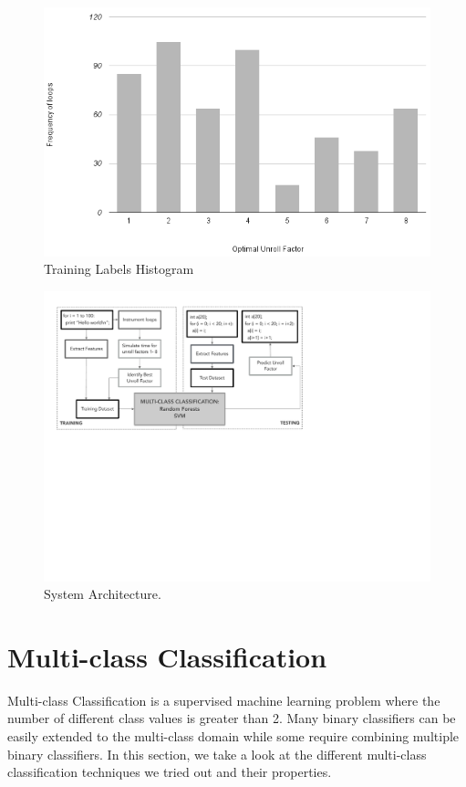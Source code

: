 \documentclass[]{sig-alternate}
\begin{document}
\begin{figure}
  \center
  \includegraphics[width=0.90\linewidth]{fig/histogram.png}
  \caption{Training Labels Histogram}
  \label{fig:trainingHistogram}
\end{figure}


\begin{figure}
  \center
  \includegraphics[width=0.9\linewidth]{fig/systemArchitecture.pdf}
  \caption{System Architecture.}
  \label{fig:systemArchitecture}
\end{figure}

\section{Multi-class Classification}
\label{sec:Multi-classClassification}

Multi-class Classification is a supervised machine learning problem where the number of different class values is greater than 2. Many binary classifiers can be easily extended to the multi-class domain while some require combining multiple binary classifiers. In this section, we take a look at the different multi-class classification techniques we tried out and their properties. 
\end{document}
